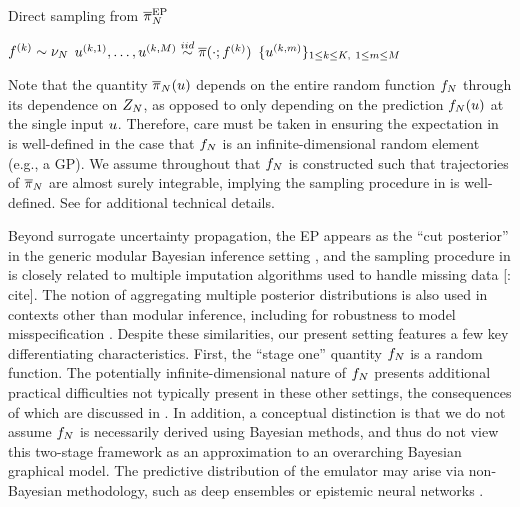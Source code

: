 \documentclass[12pt]{article}
\begin{document}
\begin{algorithm}
    \caption{Direct sampling from $\overline{\pi}_{N}^{\mathrm{EP}}$}
    \label{alg:ep}
    \begin{algorithmic}[1]
        		\State $f^{(k)} \sim \nu_{N}$ 
		\State $u^{(k, 1)}, \dots, u^{(k, M)} \overset{iid}{\sim} \overline{\pi}(\cdot; f^{(k)})$ 
	\EndFor
	\State \Return $\{u^{(k, m)}\}_{1 \leq k \leq K, \ 1 \leq m \leq M}$
	\EndFunction
    \end{algorithmic}
\end{algorithm}

Note that the quantity $\overline{\pi}_{N}(u)$ depends on the entire random function $f_{N}$ 
through its dependence on $Z_{N}$, as opposed to only depending on the prediction 
$f_{N}(u)$ at the single input $u$. Therefore, care must be taken in ensuring the 
expectation in  is well-defined in the case that $f_{N}$ is an infinite-dimensional
random element (e.g., a GP). We assume throughout that $f_{N}$ is constructed such that 
trajectories of $\overline{\pi}_{N}$ are almost surely integrable, implying the sampling procedure
in  is well-defined. See 
\citet{StuartTeck1,StuartTeck2,random_fwd_models,garegnani2021NoisyMCMC} for additional
technical details. 

Beyond surrogate uncertainty propagation, the EP appears as the ``cut posterior'' in the generic
modular Bayesian inference setting \citep{PlummerCut}, and the sampling procedure in 
 is closely related to multiple imputation algorithms used to handle missing data [\todo: cite].
The notion of aggregating multiple posterior distributions is also used in contexts other than
modular inference, including for robustness to model misspecification \citep{BayesBag,BayesBag2}. 
Despite these similarities, our present setting features a few key differentiating characteristics.
First, the ``stage one'' quantity $f_{N}$ is a random function. The potentially infinite-dimensional 
nature of $f_{N}$ presents additional practical difficulties not typically present in these other 
settings, the consequences of which are discussed in .
In addition, a conceptual distinction is that we do not assume $f_{N}$ is necessarily derived 
using Bayesian methods, and thus do not view this two-stage framework as an approximation to 
an overarching Bayesian graphical model. The predictive distribution of the emulator may arise 
via non-Bayesian methodology, such as deep ensembles \citep{deepEnsembles} or 
epistemic neural networks \citep{epistemicNN,BayesOptEpistemicNN}. 
\end{document}

